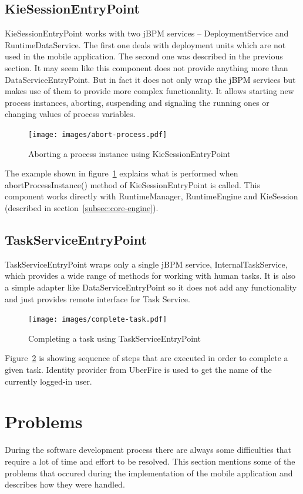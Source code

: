 \documentclass[12pt,oneside,final]{fithesis2}
\begin{document}
\subsection{KieSessionEntryPoint}

KieSessionEntryPoint works with two jBPM services -- DeploymentService and RuntimeDataService.
The first one deals with deployment units which are not used in the mobile application.
The second one was described in the previous section.
It may seem like this component does not provide anything more than DataServiceEntryPoint.
But in fact it does not only wrap the jBPM services but makes use of them to provide more complex functionality.
It allows starting new process instances, aborting, suspending and signaling the running ones or changing values of process variables.

\begin{figure}[ht!]
\centering
\texttt{[image: images/abort-process.pdf]}
\caption{Aborting a process instance using KieSessionEntryPoint}
\label{fig:abort-process}
\end{figure}

The example shown in figure~\ref{fig:abort-process} explains what is performed when abortProcessInstance() method of KieSessionEntryPoint is called.
This component works directly with RuntimeManager, RuntimeEngine and KieSession (described in section~\ref{subsec:core-engine}).

\subsection{TaskServiceEntryPoint}

TaskServiceEntryPoint wraps only a single jBPM service, InternalTaskService, which provides a wide range of methods for working with human tasks.
It is also a simple adapter like DataServiceEntryPoint so it does not add any functionality and just provides remote interface for Task Service.

\begin{figure}[ht!]
\centering
\texttt{[image: images/complete-task.pdf]}
\caption{Completing a task using TaskServiceEntryPoint}
\label{fig:complete-task}
\end{figure}


Figure~\ref{fig:complete-task} is showing sequence of steps that are executed in order to complete a given task.
Identity provider from UberFire is used to get the name of the currently logged-in user.

\section{Problems}
During the software development process there are always some difficulties that require a lot of time and effort to be resolved.
This section mentions some of the problems that occured during the implementation of the mobile application and describes how they were handled.
\end{document}
